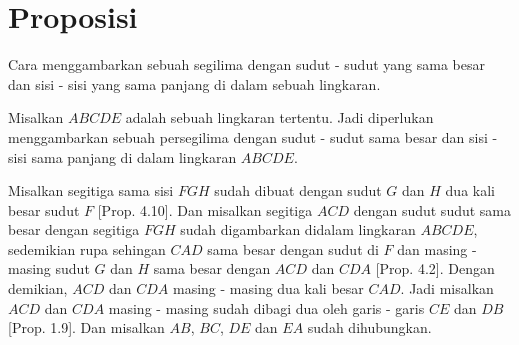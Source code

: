 \documentclass[a4paper]{book}
\begin{document}
\section*{\centering Proposisi \thesection}
Cara menggambarkan sebuah segilima dengan sudut - sudut yang sama besar dan
sisi - sisi yang sama panjang di dalam sebuah lingkaran.
\begin{center} 
\end{center}

Misalkan $ABCDE$ adalah sebuah lingkaran tertentu. Jadi diperlukan 
menggambarkan sebuah persegilima dengan sudut - sudut sama besar dan sisi - 
sisi sama panjang di dalam lingkaran $ABCDE$.

Misalkan segitiga sama sisi $FGH$ sudah dibuat dengan sudut $G$ dan $H$ dua
kali besar sudut $F$ [Prop. 4.10]. Dan misalkan segitiga $ACD$ dengan sudut
sudut sama besar dengan segitiga $FGH$ sudah digambarkan didalam lingkaran
$ABCDE$, sedemikian rupa sehingan $CAD$ sama besar dengan sudut di $F$ dan
masing - masing sudut $G$ dan $H$ sama besar dengan $ACD$ dan $CDA$ 
[Prop. 4.2]. Dengan demikian, $ACD$ dan $CDA$ masing - masing dua kali 
besar $CAD$. Jadi misalkan $ACD$ dan $CDA$ masing - masing
sudah dibagi dua oleh garis - garis $CE$ dan $DB$ [Prop. 1.9]. Dan misalkan
$AB$, $BC$, $DE$ dan $EA$ sudah dihubungkan.
\end{document}
